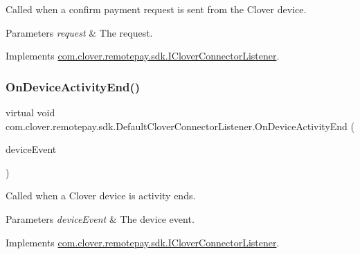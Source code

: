 Called when a confirm payment request is sent from the Clover device. 


\begin{DoxyParams}{Parameters}
{\em request} & The request.\\
\hline
\end{DoxyParams}


Implements \hyperlink{interfacecom_1_1clover_1_1remotepay_1_1sdk_1_1_i_clover_connector_listener_a2295110c07af954e141ee82acde10e8a}{com.\+clover.\+remotepay.\+sdk.\+I\+Clover\+Connector\+Listener}.

\mbox{\label{classcom_1_1clover_1_1remotepay_1_1sdk_1_1_default_clover_connector_listener_a3f72c953ad6dafe916936e23a5d38cd5}} 
\subsubsection{\texorpdfstring{On\+Device\+Activity\+End()}{OnDeviceActivityEnd()}}
{\footnotesize\ttfamily virtual void com.\+clover.\+remotepay.\+sdk.\+Default\+Clover\+Connector\+Listener.\+On\+Device\+Activity\+End (\begin{DoxyParamCaption}\item[{\hyperlink{classcom_1_1clover_1_1remotepay_1_1sdk_1_1_clover_device_event}{Clover\+Device\+Event}}]{device\+Event }\end{DoxyParamCaption})\hspace{0.3cm}{\ttfamily [virtual]}}



Called when a Clover device is activity ends. 


\begin{DoxyParams}{Parameters}
{\em device\+Event} & The device event.\\
\hline
\end{DoxyParams}


Implements \hyperlink{interfacecom_1_1clover_1_1remotepay_1_1sdk_1_1_i_clover_connector_listener_ad9b3f0be387c91e5f7de406b22478e39}{com.\+clover.\+remotepay.\+sdk.\+I\+Clover\+Connector\+Listener}.

